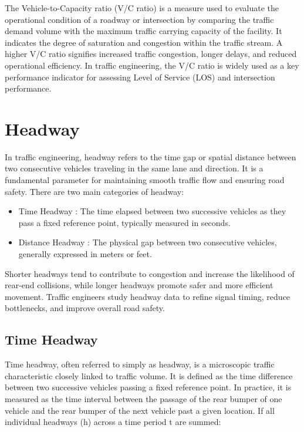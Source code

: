 The Vehicle-to-Capacity ratio (V/C ratio) is a measure used to 
evaluate the operational condition of a roadway or 
intersection by comparing the traffic demand volume with the 
maximum traffic carrying capacity of the facility. It 
indicates the degree of saturation and congestion within the 
traffic stream. A higher V/C ratio signifies increased traffic 
congestion, longer delays, and reduced operational efficiency. 
In traffic engineering, the V/C ratio is widely used as a key performance indicator for assessing Level of Service (LOS) and intersection performance.

\section{Headway}

In traffic engineering, headway refers to the time gap or spatial distance between two consecutive vehicles traveling in the same lane and direction. It is a fundamental parameter for maintaining smooth traffic flow and ensuring road safety.
There are two main categories of headway:
\begin{itemize}
    \item Time Headway : The time elapsed between two successive vehicles as they pass a fixed reference point, typically measured in seconds.
    \item Distance Headway : The physical gap between two consecutive vehicles, generally expressed in meters or feet.
\end{itemize}

Shorter headways tend to contribute to congestion and 
increase the likelihood of rear-end collisions, while longer 
headways promote safer and more efficient movement. Traffic 
engineers study headway data to refine signal timing, reduce 
bottlenecks, and improve overall road safety.



\subsection{Time Headway}

Time headway, often referred to simply as headway, is a 
microscopic traffic characteristic closely linked to traffic 
volume. It is defined as the time difference between two 
successive vehicles passing a fixed reference point. In 
practice, it is measured as the time interval between the 
passage of the rear bumper of one vehicle and the rear 
bumper of the next vehicle past a given location. If all 
individual headways (h) across a time period t are summed:

